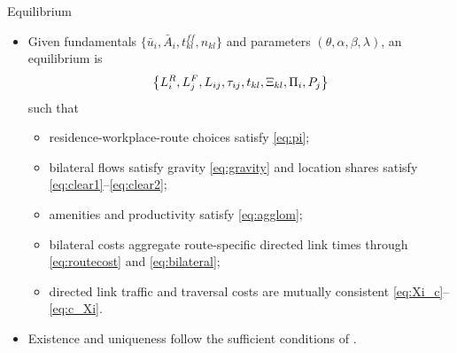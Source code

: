 \documentclass[11pt,aspectratio=169]{beamer}
\newcommand{\app}[1]{\allowbreak\hspace{0.25em}\hyperlink{#1}{\beamergotobutton{details}}}
\begin{document}
\begin{frame}[label=equilibrium]{Equilibrium}
\begin{itemize}\footnotesize
  \item Given fundamentals $\{\bar u_i,\bar A_i,t_{kl}^{ff},n_{kl}\}$ and parameters $(\theta,\alpha,\beta,\lambda)$, an equilibrium is
  \vspace{-0.45em}\begin{equation}
    \left\{L_i^R,L_j^F,L_{ij},\tau_{ij},t_{kl},\Xi_{kl},\Pi_i,P_j\right\}
  \vspace{-0.55em}\end{equation}
  such that
  \begin{itemize}\scriptsize
    \item residence-workplace-route choices satisfy \eqref{eq:pi};
    \item bilateral flows satisfy gravity \eqref{eq:gravity} and location shares satisfy \eqref{eq:clear1}--\eqref{eq:clear2};
    \item amenities and productivity satisfy \eqref{eq:agglom};
    \item bilateral costs aggregate route-specific directed link times through \eqref{eq:routecost} and \eqref{eq:bilateral};
    \item directed link traffic and traversal costs are mutually consistent \eqref{eq:Xi_c}--\eqref{eq:c_Xi}.
  \end{itemize}
  \item Existence and uniqueness follow the sufficient conditions of \citet[Proposition~1]{allenarkolakis2022}. \app{appexist}
\end{itemize}
\end{frame}

\end{document}
